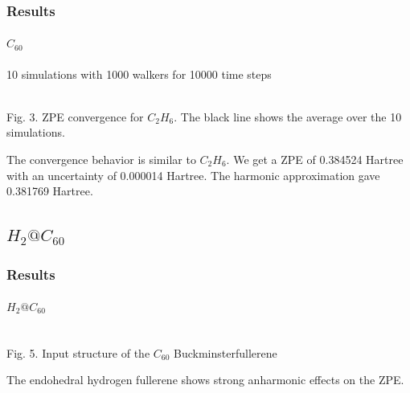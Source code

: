 \documentclass[16pt]{beamer}
\begin{document}
\begin{frame}
\frametitle{Results}
\framesubtitle{$C_{60}$}
10 simulations with 1000 walkers for 10000 time steps
\begin{center}
\\
Fig. 3. ZPE convergence for $C_2 H_6$. The black line shows the average over the 10 simulations.
\end{center}
The convergence behavior is similar to $C_2H_6$. We get a ZPE of 0.384524 Hartree with an uncertainty of 0.000014 Hartree. The harmonic approximation gave 0.381769 Hartree.
\end{frame}


\subsection{$H_2@C_{60}$}

\begin{frame}
\frametitle{Results}
\framesubtitle{$H_2@C_{60}$}
\begin{center}
\\
Fig. 5. Input structure of the $C_{60}$ Buckminsterfullerene
\end{center}
The endohedral hydrogen fullerene shows strong anharmonic effects on the ZPE.\\
\end{frame}
\end{document}
